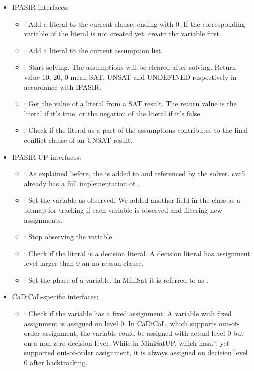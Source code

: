 \begin{itemize}
  \item IPASIR interfaces:
  \begin{itemize}
    \item {}: Add a literal to the current clause, ending with 0. If the corresponding variable of the literal is not created yet, create the variable first.
    \item {}: Add a literal to the current assumption list.
    \item {}: Start solving. The assumptions will be cleared after solving. Return value 10, 20, 0 mean SAT, UNSAT and UNDEFINED respectively in accordance with IPASIR.
    \item {}: Get the value of a literal from a SAT result. The return value is the literal if it's true, or the negation of the literal if it's false.
    \item {}: Check if the literal as a part of the assumptions contributes to the final conflict clause of an UNSAT result.
  \end{itemize}
  \item IPASIR-UP interfaces:
  \begin{itemize}
    \item {}: As explained before, the  is added to and referenced by the solver. cvc5 already has a full implementation of .
    \item {}: Set the variable as observed. We added another field  in the  class as a bitmap for tracking if each variable is observed and filtering new assignments.
    \item {}: Stop observing the variable.
    \item {}: Check if the literal is a decision literal. A decision literal has assignment level larger than 0 an no reason clause.
    \item {}: Set the phase of a variable. In MiniSat it is referred to as .
  \end{itemize}
  \item CaDiCaL-specific interfaces:
  \begin{itemize}
    \item {}: Check if the variable has a fixed assignment. A variable with fixed assignment is assigned on level 0. In CaDiCaL, which supports out-of-order assignment, the variable could be assigned with actual level 0 but on a non-zero decision level. While in MiniSatUP, which hasn't yet supported out-of-order assignment, it is always assigned on decision level 0 after backtracking.

\end{itemize}
\end{itemize}
